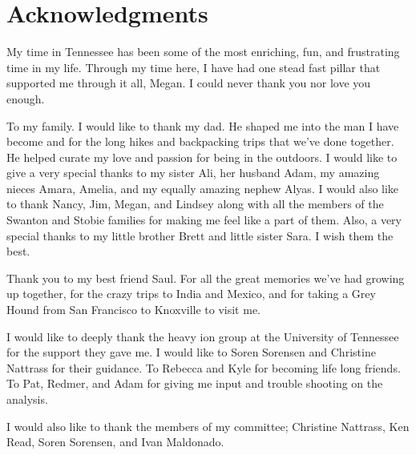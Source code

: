 \chapter*{Acknowledgments}\label{ch:acknowledgments}
My time in Tennessee has been some of the most enriching, fun, and frustrating time in my life.  Through my time here, I have had one stead fast pillar that supported me through it all, Megan.  I could never thank you nor love you enough.

\par
To my family. I would like to thank my dad.  He shaped  me into the man I have become and for the long hikes and backpacking trips that we've done together.  He helped curate my love and passion for being in the outdoors.  I would like to give a very special thanks to my sister Ali, her husband Adam, my amazing nieces Amara, Amelia, and my equally amazing nephew Alyas.  I would also like to thank Nancy, Jim, Megan, and Lindsey along with all the members of the Swanton and Stobie families for making me feel like a part of them.  Also, a very special thanks to my little brother Brett and little sister Sara.  I wish them the best.

\par
Thank you to my best friend Saul.  For all the great memories we've had growing up together, for the crazy trips to India and Mexico, and for taking a Grey Hound from San Francisco to Knoxville to visit me.  

\par
I would like to deeply thank the heavy ion group at the University of Tennessee for the support they gave me.  I would like to Soren Sorensen and Christine Nattrass for their guidance.  To Rebecca and Kyle for becoming life long friends.  To Pat, Redmer, and Adam for giving me input and trouble shooting on the analysis.

\par 
I would also like to thank the members of my committee; Christine Nattrass, Ken Read, Soren Sorensen, and Ivan Maldonado. 

